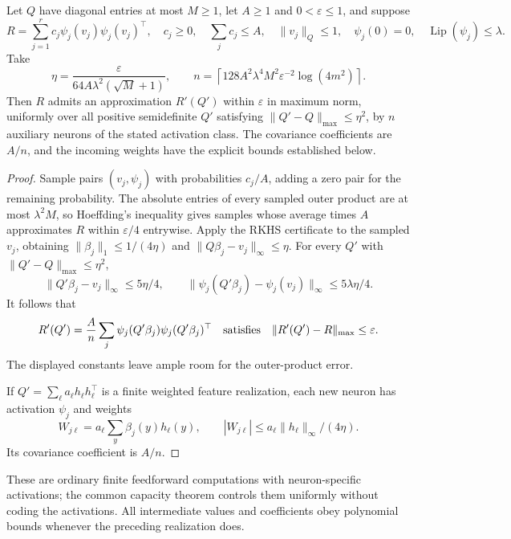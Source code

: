 \begin{proposition}
\label{prop:generic-atom-realization}
Let $Q$ have diagonal entries at most $M\ge1$, let $A\ge1$ and
$0<\varepsilon\le1$, and suppose
\[
 R=\sum_{j=1}^r c_j\psi_j(v_j)\psi_j(v_j)^\top,\quad
 c_j\ge0,\quad\sum_jc_j\le A,\quad\|v_j\|_Q\le1,
 \quad\psi_j(0)=0,\quad\operatorname{Lip}(\psi_j)\le\lambda.
\]
Take
\[
 \eta=\frac{\varepsilon}{64A\lambda^2(\sqrt M+1)},\qquad
 n=\left\lceil128A^2\lambda^4M^2\varepsilon^{-2}\log(4m^2)\right\rceil.
\]
Then $R$ admits an approximation $R'(Q')$ within $\varepsilon$ in maximum
norm, uniformly over all positive semidefinite $Q'$ satisfying
$\|Q'-Q\|_{\max}\le\eta^2$, by $n$ auxiliary neurons of the stated
activation class. The covariance coefficients are $A/n$, and the
incoming weights have the explicit bounds established below.
\end{proposition}
\begin{proof}
Sample pairs $(v_j,\psi_j)$ with probabilities $c_j/A$, adding a zero
pair for the remaining probability. The absolute entries of every
sampled outer product are at most $\lambda^2M$, so Hoeffding's inequality
gives samples whose average times $A$ approximates $R$ within
$\varepsilon/4$ entrywise. Apply the RKHS certificate to the sampled
$v_j$, obtaining $\|\beta_j\|_1\le1/(4\eta)$ and
$\|Q\beta_j-v_j\|_\infty\le\eta$.
For every $Q'$ with $\|Q'-Q\|_{\max}\le\eta^2$,
\[
 \|Q'\beta_j-v_j\|_\infty\le5\eta/4,
 \qquad
 \|\psi_j(Q'\beta_j)-\psi_j(v_j)\|_\infty\le5\lambda\eta/4.
\]
It follows that
\[
 R'(Q')=\frac A n\sum_j
             \psi_j(Q'\beta_j)\psi_j(Q'\beta_j)^\top
 \quad\hbox{satisfies}\quad
 \|R'(Q')-R\|_{\max}\le\varepsilon.
\]
The displayed constants leave ample room for the outer-product error.

If $Q'=\sum_\ell a_\ell h_\ell h_\ell^\top$ is a finite weighted
feature realization, each new neuron has activation $\psi_j$ and weights
\[
 W_{j\ell}=a_\ell\sum_y\beta_j(y)h_\ell(y),
 \qquad |W_{j\ell}|\le a_\ell\|h_\ell\|_\infty/(4\eta).
\]
Its covariance coefficient is $A/n$.
\end{proof}
These are ordinary finite
feedforward computations with neuron-specific activations; the common
capacity theorem controls them uniformly without coding the activations.
All intermediate values and coefficients obey polynomial bounds whenever
the preceding realization does.
